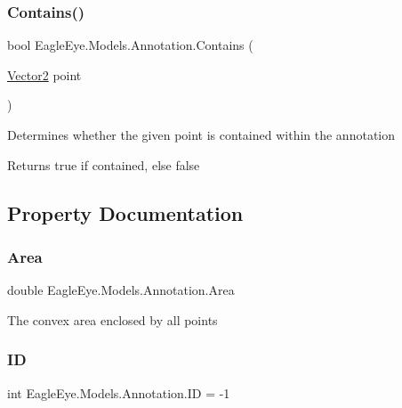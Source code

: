 \subsubsection{\texorpdfstring{Contains()}{Contains()}}
{\footnotesize\ttfamily bool Eagle\+Eye.\+Models.\+Annotation.\+Contains (\begin{DoxyParamCaption}\item[{\mbox{\hyperlink{struct_eagle_eye_1_1_models_1_1_geometry_1_1_vector2}{Vector2}}}]{point }\end{DoxyParamCaption})}



Determines whether the given point is contained within the annotation 

\begin{DoxyReturn}{Returns}
true if contained, else false 
\end{DoxyReturn}


\subsection{Property Documentation}
\mbox{\label{class_eagle_eye_1_1_models_1_1_annotation_a7aa19d95b7a54855720530c69e9b2500}} 
\subsubsection{\texorpdfstring{Area}{Area}}
{\footnotesize\ttfamily double Eagle\+Eye.\+Models.\+Annotation.\+Area\hspace{0.3cm}{\ttfamily [get]}}



The convex area enclosed by all points 

\mbox{\label{class_eagle_eye_1_1_models_1_1_annotation_aeebf4ecafcfcdf37537dcd03d0cc150e}} 
\subsubsection{\texorpdfstring{ID}{ID}}
{\footnotesize\ttfamily int Eagle\+Eye.\+Models.\+Annotation.\+ID = -\/1\hspace{0.3cm}{\ttfamily [get]}}




